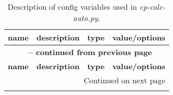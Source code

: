 %
\begin{landscape}
\begin{longtable}{p{4cm}p{5cm}p{2cm}p{8cm}}
	\caption{Description of config variables used in \emph{cp-calc-auto.py}.}\label{tbl:cfg-vars_cp-calc-auto}\\
	\textbf{name}	&\textbf{description}	&\textbf{type}	&\textbf{value/options}\\
	\toprule
	\endfirsthead

	\multicolumn{4}{c}{{\bfseries \tablename\ \thetable{} -- continued from previous page}} \\
	\toprule
	\textbf{name}	&\textbf{description}	&\textbf{type}	&\textbf{value/options}\\
	\toprule
	\endhead

	\hline \multicolumn{4}{|r|}{{Continued on next page}} \\ \hline
	\endfoot

	\toprule
	\endlastfoot
	

\end{longtable}
\end{landscape}

